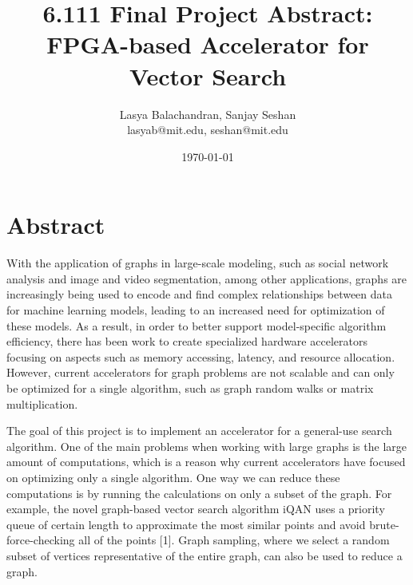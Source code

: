 \documentclass{article}
\title{6.111 Final Project Abstract: \\ FPGA-based Accelerator for Vector Search}
\author{Lasya Balachandran, Sanjay Seshan\\lasyab@mit.edu, seshan@mit.edu}
\date{\today}
\begin{document}
\maketitle



\section*{Abstract}
With the application of graphs in large-scale modeling, such as social network analysis and image and video segmentation, among other applications, graphs are increasingly being used to encode and find complex relationships between data for machine learning models, leading to an increased need for optimization of these models. As a result, in order to better support model-specific algorithm efficiency, there has been work to create specialized hardware accelerators focusing on aspects such as memory accessing, latency, and resource allocation. However, current accelerators for graph problems are not scalable and can only be optimized for a single algorithm, such as graph random walks or matrix multiplication. 

The goal of this project is to implement an accelerator for a general-use search algorithm. One of the main problems when working with large graphs is the large amount of computations, which is a reason why current accelerators have focused on optimizing only a single algorithm. One way we can reduce these computations is by running the calculations on only a subset of the graph. For example, the novel graph-based vector search algorithm iQAN uses a priority queue of certain length to approximate the most similar points and avoid brute-force-checking all of the points [1]. Graph sampling, where we select a random subset of vertices representative of the entire graph, can also be used to reduce a graph.

\end{document}
